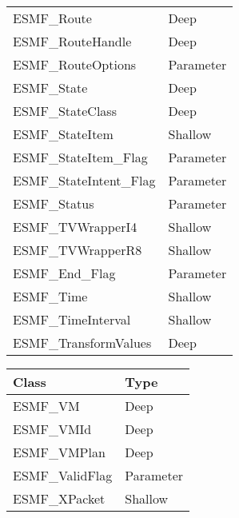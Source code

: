 \begin{table}[t]
\begin{tabular}{ll}
ESMF\_Route                 & Deep \\
ESMF\_RouteHandle           & Deep \\
ESMF\_RouteOptions          & Parameter \\
ESMF\_State                 & Deep \\
ESMF\_StateClass            & Deep \\
ESMF\_StateItem             & Shallow\\
ESMF\_StateItem\_Flag       & Parameter \\
ESMF\_StateIntent\_Flag     & Parameter \\
ESMF\_Status                & Parameter \\
ESMF\_TVWrapperI4           & Shallow\\
ESMF\_TVWrapperR8           & Shallow\\
ESMF\_End\_Flag       & Parameter \\
ESMF\_Time                  & Shallow\\
ESMF\_TimeInterval          & Shallow\\
ESMF\_TransformValues       & Deep \\

\end{tabular}
\end{table}

\begin{table}[t]
\begin{tabular}{ll}

{\bf Class} &  {\bf Type} \\ \hline

ESMF\_VM                    & Deep \\
ESMF\_VMId                  & Deep \\
ESMF\_VMPlan                & Deep \\
ESMF\_ValidFlag             & Parameter \\
ESMF\_XPacket               & Shallow\\

\end{tabular}
\end{table}



















